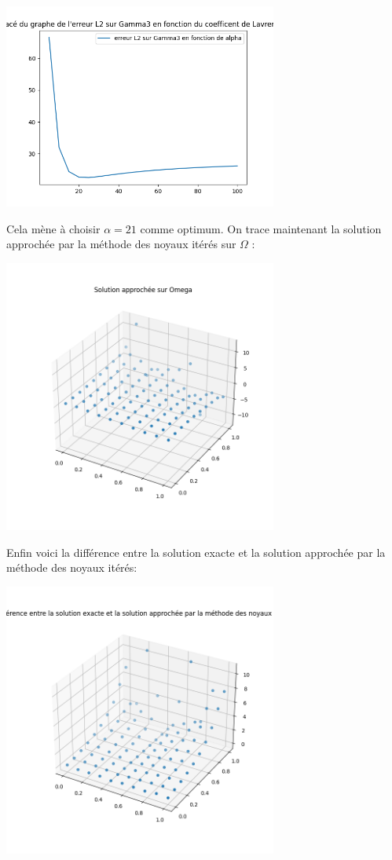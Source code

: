 \documentclass{article}
\begin{document}
    {
    \includegraphics[width=9cm]{Etude_erreur_selon_alpha_noyaux.png} \par}
    \bigskip
    Cela mène à choisir $\alpha = 21 $ comme optimum. On trace maintenant la solution approchée par la méthode des noyaux itérés sur $\Omega$ :

    {
    \includegraphics[width=9cm]{calc_noyaux.png} \par}
    \bigskip

    Enfin voici la différence entre la solution exacte et la solution approchée par la méthode des noyaux itérés:

    {
    \includegraphics[width=9cm]{Diff_noyaux.png} \par}
    \bigskip
\end{document}
